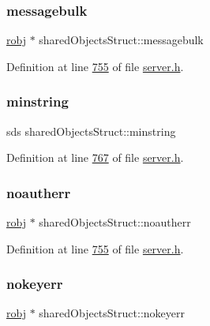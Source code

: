 \subsubsection{\texorpdfstring{messagebulk}{messagebulk}}
{\footnotesize\ttfamily \hyperlink{structredisObject}{robj} $\ast$ shared\+Objects\+Struct\+::messagebulk}



Definition at line \hyperlink{server_8h_source_l00755}{755} of file \hyperlink{server_8h_source}{server.\+h}.

\mbox{\label{structsharedObjectsStruct_a7967b4e4fdf21e8b8ab79b8d79563bb9}} 
\subsubsection{\texorpdfstring{minstring}{minstring}}
{\footnotesize\ttfamily sds shared\+Objects\+Struct\+::minstring}



Definition at line \hyperlink{server_8h_source_l00767}{767} of file \hyperlink{server_8h_source}{server.\+h}.

\mbox{\label{structsharedObjectsStruct_ac0f3ee5824320ba1a54ec483792fc052}} 
\subsubsection{\texorpdfstring{noautherr}{noautherr}}
{\footnotesize\ttfamily \hyperlink{structredisObject}{robj} $\ast$ shared\+Objects\+Struct\+::noautherr}



Definition at line \hyperlink{server_8h_source_l00755}{755} of file \hyperlink{server_8h_source}{server.\+h}.

\mbox{\label{structsharedObjectsStruct_a781df120af930aaf87b2fff06b6c0d6d}} 
\subsubsection{\texorpdfstring{nokeyerr}{nokeyerr}}
{\footnotesize\ttfamily \hyperlink{structredisObject}{robj} $\ast$ shared\+Objects\+Struct\+::nokeyerr}



